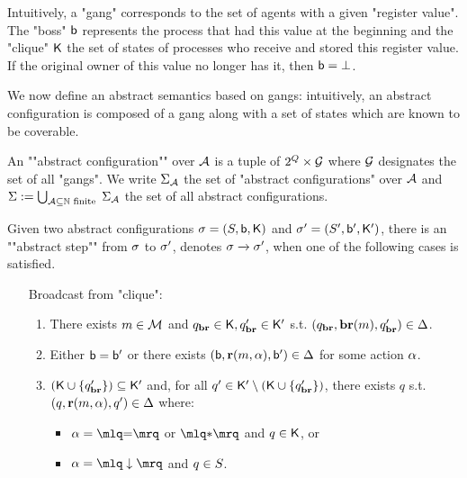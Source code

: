 Intuitively, a "gang" corresponds to the set of agents with a given "register value". The "boss" $\mathsf{b}$ represents the process that had this value at the beginning and the "clique" $\mathsf{K}$ the set of states of processes who receive and stored this register value. If the original owner of this value no longer has it, then $\mathsf{b} = \bot$.


We now define an abstract semantics based on gangs: intuitively, an abstract configuration is composed of a gang along with a set of states which are known to be coverable.

\begin{definition}
\label{def:abstract-configuration}
An ""abstract configuration"" over $\mathcal{A}$ is a tuple of $2^Q \times \mathcal{G}$ where $\mathcal{G}$ designates the set of all "gangs". We write $\Sigma_{\mathcal{A}}$ the set of "abstract configurations" over $\mathcal{A}$ and $\Sigma := \bigcup_{\mathcal{A} \subseteq \mathbb{N} \text{ finite }}\Sigma_{\mathcal{A}}$ the set of all abstract configurations. 

Given two abstract configurations $\sigma = (S, \mathsf{b}, \mathsf{K})$ and $\sigma' = (S', \mathsf{b}', \mathsf{K}')$, there is an ""abstract step"" from $\sigma$ to $\sigma'$, denotes $\sigma \xrightarrow{} \sigma'$, when one of the following cases is satisfied.
\begin{enumerate}
\item[Broadcast from "clique":] 
	\begin{enumerate}[label=(\roman*)]
		\item\label{item:broadcast_from_clique_broadcast} There exists $m \in \mathcal{M}$ and $q_{\textbf{br}} \in \mathsf{K}, q_{\textbf{br}}' \in \mathsf{K}'$ s.t. $(q_{\textbf{br}}, \textbf{br}(m), q_{\textbf{br}}') \in \Delta$. 
		
		\item\label{item:broadcast_from_clique_boss} Either $\mathsf{b} = \mathsf{b}'$ or there exists $(\mathsf{b}, \textbf{r}(m, \alpha), \mathsf{b}') \in \Delta$ for some action $\alpha$.

		\item\label{item:broadcast_from_clique_clique}$(\mathsf{K} \cup \{q_{\textbf{br}}'\}) \subseteq \mathsf{K}'$ and, for all $q' \in \mathsf{K}' \setminus (\mathsf{K} \cup \{q_{\textbf{br}}'\})$, there exists $q$ s.t. $(q, \textbf{r}(m, \alpha), q') \in \Delta$ where:
		\begin{itemize}
			\item $\anact = \quotemarks{\eqtestact}$ or $\quotemarks{\dummyact}$ and $q \in \mathsf{K}$, or
			\item $\anact= \quotemarks{\enregact}$ and $q \in S$.
		\end{itemize}
		

\end{enumerate}
\end{enumerate}
\end{definition}
